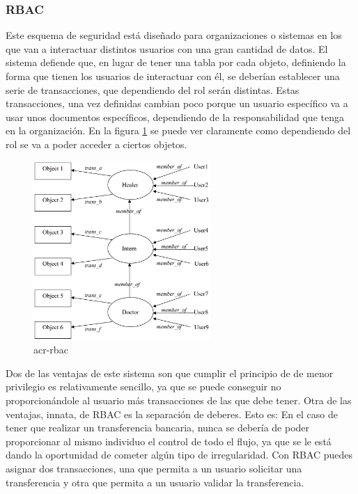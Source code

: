 \documentclass[titlepage, 12pt, a4paper]{article}
\begin{document}
\subsubsection{\gls{RBAC}}
Este esquema de seguridad está diseñado para organizaciones o sistemas en los que van a interactuar distintos usuarios con una gran cantidad de datos. El sistema defiende que, en lugar de tener una tabla por cada objeto, definiendo la forma que tienen los usuarios de interactuar con él, se deberían establecer una serie de transacciones, que dependiendo del rol serán distintas. Estas transacciones, una vez definidas cambian poco porque un usuario específico va a usar unos documentos específicos, dependiendo de la responsabilidad que tenga en la organización. En la figura \ref{fig:RBAC} se puede ver claramente como dependiendo del rol se va a poder acceder a ciertos objetos.
\begin{figure}[H]
    \centering
    \includegraphics[width=0.6\textwidth]{Media/RBAC.PNG}
    \caption{\gls{acr-rbac}}
    \label{fig:RBAC}
\end{figure}
Dos de las ventajas de este sistema son que cumplir el principio de de menor privilegio es relativamente sencillo, ya que se puede conseguir no proporcionándole  al usuario más transacciones de las que debe tener. Otra de las ventajas, innata, de \gls{RBAC} es la separación de deberes. Esto es: En el caso de tener que realizar un transferencia bancaria, nunca se debería de poder proporcionar al mismo individuo el control de todo el flujo, ya que se le está dando la oportunidad de cometer algún tipo de irregularidad. Con RBAC puedes asignar dos transacciones, una que permita a un usuario solicitar una transferencia y otra que permita a un usuario validar la transferencia.
\end{document}
